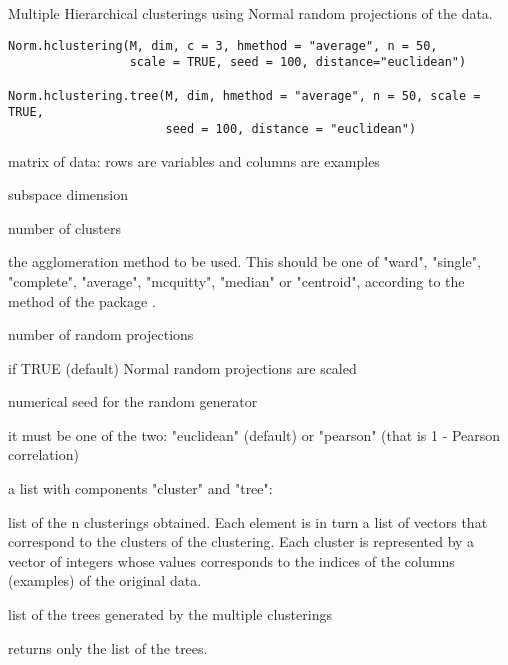 \documentclass{article}
\begin{document}
\begin{Description}\relax
Multiple Hierarchical clusterings using Normal random projections of the data.
\end{Description}
\begin{Usage}
\begin{verbatim}
Norm.hclustering(M, dim, c = 3, hmethod = "average", n = 50, 
                 scale = TRUE, seed = 100, distance="euclidean")

Norm.hclustering.tree(M, dim, hmethod = "average", n = 50, scale = TRUE, 
                      seed = 100, distance = "euclidean")
\end{verbatim}
\end{Usage}
\begin{Arguments}
\begin{ldescription}
\item[\code{M}] matrix of data: rows are variables and columns are examples 
\item[\code{dim}] subspace dimension 
\item[\code{c}] number of clusters 
\item[\code{hmethod}] the agglomeration method to be used. This should be one of 
"ward", "single", "complete", "average", "mcquitty", "median" or "centroid", 
according to the 
method of the package . 
\item[\code{n}] number of  random projections 
\item[\code{scale}] if TRUE (default) Normal random projections are scaled 
\item[\code{seed}] numerical seed for the random generator 
\item[\code{distance}] it must be one of the two: "euclidean" (default) or "pearson" (that is 1 - Pearson correlation) 
\end{ldescription}
\end{Arguments}
\begin{Value}
a list with components "cluster" and "tree":
\begin{ldescription}
\item[\code{cluster }] list of the n clusterings obtained. Each element is in turn a list of vectors that correspond 
to the clusters of the clustering. Each cluster is represented by a vector of integers whose values corresponds to 
the indices of the columns (examples) of the original data. 
\item[\code{tree }] list of the trees generated by the multiple clusterings
\end{ldescription}


 returns only the list of the trees.
\end{Value}
\end{document}
